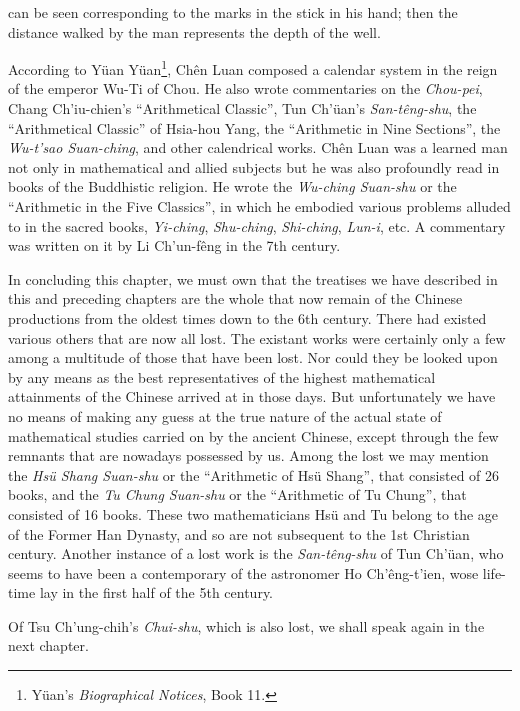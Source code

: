 \documentclass[11pt]{article}
\newcommand{\scanpage}[2]{\clearpage\setcounter{footnote}{0}\noindent{\footnotesize\color{gray}PDF page #1 · #2}\par\medskip}
\newcommand{\scanfooter}{}
\begin{document}
\scanpage{0059}{Chapter 6, printed page 45; end of chapter}

can be seen corresponding to the marks in the stick in his hand; then the distance walked by the man represents the depth of the well.

According to Yüan Yüan\footnote{Yüan's \emph{Biographical Notices}, Book 11.}, Chên Luan composed a calendar system in the reign of the emperor Wu-Ti of Chou. He also wrote commentaries on the \emph{Chou-pei}, Chang Ch'iu-chien's ``Arithmetical Classic'', Tun Ch'üan's \emph{San-têng-shu}, the ``Arithmetical Classic'' of Hsia-hou Yang, the ``Arithmetic in Nine Sections'', the \emph{Wu-t'sao Suan-ching}, and other calendrical works. Chên Luan was a learned man not only in mathematical and allied subjects but he was also profoundly read in books of the Buddhistic religion. He wrote the \emph{Wu-ching Suan-shu} or the ``Arithmetic in the Five Classics'', in which he embodied various problems alluded to in the sacred books, \emph{Yi-ching}, \emph{Shu-ching}, \emph{Shi-ching}, \emph{Lun-i}, etc. A commentary was written on it by Li Ch'un-fêng in the 7th century.

In concluding this chapter, we must own that the treatises we have described in this and preceding chapters are the whole that now remain of the Chinese productions from the oldest times down to the 6th century. There had existed various others that are now all lost. The existant works were certainly only a few among a multitude of those that have been lost. Nor could they be looked upon by any means as the best representatives of the highest mathematical attainments of the Chinese arrived at in those days. But unfortunately we have no means of making any guess at the true nature of the actual state of mathematical studies carried on by the ancient Chinese, except through the few remnants that are nowadays possessed by us. Among the lost we may mention the \emph{Hsü Shang Suan-shu} or the ``Arithmetic of Hsü Shang'', that consisted of 26 books, and the \emph{Tu Chung Suan-shu} or the ``Arithmetic of Tu Chung'', that consisted of 16 books. These two mathematicians Hsü and Tu belong to the age of the Former Han Dynasty, and so are not subsequent to the 1st Christian century. Another instance of a lost work is the \emph{San-têng-shu} of Tun Ch'üan, who seems to have been a contemporary of the astronomer Ho Ch'êng-t'ien, wose life-time lay in the first half of the 5th century.

Of Tsu Ch'ung-chih's \emph{Chui-shu}, which is also lost, we shall speak again in the next chapter.
\scanfooter
\end{document}
